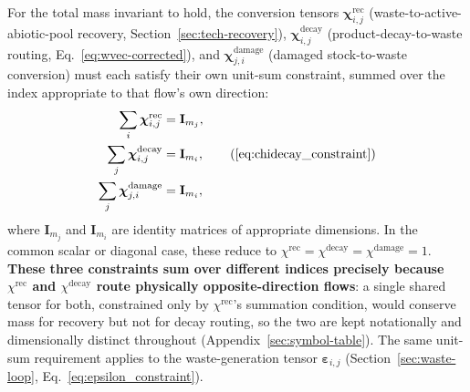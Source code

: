 \documentclass[twocolumn,10pt]{article}
\begin{document}
For the total mass invariant to hold, the conversion tensors $\boldsymbol{\chi}^{\text{rec}}_{i,j}$ (waste-to-active-abiotic-pool recovery, Section~\ref{sec:tech-recovery}), $\boldsymbol{\chi}^{\text{decay}}_{i,j}$ (product-decay-to-waste routing, Eq.~\eqref{eq:wvec-corrected}), and $\boldsymbol{\chi}^{\text{damage}}_{j,i}$ (damaged stock-to-waste conversion) must each satisfy their own unit-sum constraint, summed over the index appropriate to that flow's own direction:
\begin{align}
\sum_i \boldsymbol{\chi}^{\text{rec}}_{i,j} &= \mathbf{I}_{m_j}, \label{eq:chi_constraint} \\
\sum_j \boldsymbol{\chi}^{\text{decay}}_{i,j} &= \mathbf{I}_{m_i}, \tag{\ref{eq:chidecay_constraint}}\\
\sum_j \boldsymbol{\chi}^{\text{damage}}_{j,i} &= \mathbf{I}_{m_i}, \label{eq:chidamage_constraint}
\end{align}
where $\mathbf{I}_{m_j}$ and $\mathbf{I}_{m_i}$ are identity matrices of appropriate dimensions. In the common scalar or diagonal case, these reduce to $\chi^{\text{rec}}=\chi^{\text{decay}}=\chi^{\text{damage}}=1$. \textbf{These three constraints sum over different indices precisely because $\chi^{\text{rec}}$ and $\chi^{\text{decay}}$ route physically opposite-direction flows}: a single shared tensor for both, constrained only by $\chi^{\text{rec}}$'s summation condition, would conserve mass for recovery but not for decay routing, so the two are kept notationally and dimensionally distinct throughout (Appendix~\ref{sec:symbol-table}). The same unit-sum requirement applies to the waste-generation tensor $\boldsymbol\varepsilon_{i,j}$ (Section~\ref{sec:waste-loop}, Eq.~\eqref{eq:epsilon_constraint}).
\end{document}
